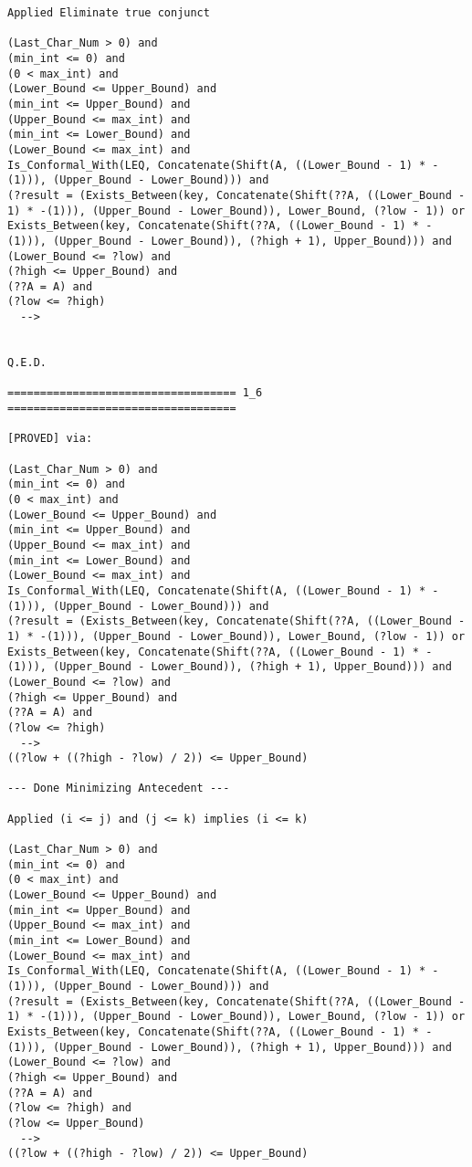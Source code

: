 \begin{lstlisting}[language=resolve]
Applied Eliminate true conjunct

(Last_Char_Num > 0) and
(min_int <= 0) and
(0 < max_int) and
(Lower_Bound <= Upper_Bound) and
(min_int <= Upper_Bound) and
(Upper_Bound <= max_int) and
(min_int <= Lower_Bound) and
(Lower_Bound <= max_int) and
Is_Conformal_With(LEQ, Concatenate(Shift(A, ((Lower_Bound - 1) * -(1))), (Upper_Bound - Lower_Bound))) and
(?result = (Exists_Between(key, Concatenate(Shift(??A, ((Lower_Bound - 1) * -(1))), (Upper_Bound - Lower_Bound)), Lower_Bound, (?low - 1)) or Exists_Between(key, Concatenate(Shift(??A, ((Lower_Bound - 1) * -(1))), (Upper_Bound - Lower_Bound)), (?high + 1), Upper_Bound))) and
(Lower_Bound <= ?low) and
(?high <= Upper_Bound) and
(??A = A) and
(?low <= ?high)
  -->


Q.E.D.

=================================== 1_6 ===================================

[PROVED] via:

(Last_Char_Num > 0) and
(min_int <= 0) and
(0 < max_int) and
(Lower_Bound <= Upper_Bound) and
(min_int <= Upper_Bound) and
(Upper_Bound <= max_int) and
(min_int <= Lower_Bound) and
(Lower_Bound <= max_int) and
Is_Conformal_With(LEQ, Concatenate(Shift(A, ((Lower_Bound - 1) * -(1))), (Upper_Bound - Lower_Bound))) and
(?result = (Exists_Between(key, Concatenate(Shift(??A, ((Lower_Bound - 1) * -(1))), (Upper_Bound - Lower_Bound)), Lower_Bound, (?low - 1)) or Exists_Between(key, Concatenate(Shift(??A, ((Lower_Bound - 1) * -(1))), (Upper_Bound - Lower_Bound)), (?high + 1), Upper_Bound))) and
(Lower_Bound <= ?low) and
(?high <= Upper_Bound) and
(??A = A) and
(?low <= ?high)
  -->
((?low + ((?high - ?low) / 2)) <= Upper_Bound)

--- Done Minimizing Antecedent ---

Applied (i <= j) and (j <= k) implies (i <= k)

(Last_Char_Num > 0) and
(min_int <= 0) and
(0 < max_int) and
(Lower_Bound <= Upper_Bound) and
(min_int <= Upper_Bound) and
(Upper_Bound <= max_int) and
(min_int <= Lower_Bound) and
(Lower_Bound <= max_int) and
Is_Conformal_With(LEQ, Concatenate(Shift(A, ((Lower_Bound - 1) * -(1))), (Upper_Bound - Lower_Bound))) and
(?result = (Exists_Between(key, Concatenate(Shift(??A, ((Lower_Bound - 1) * -(1))), (Upper_Bound - Lower_Bound)), Lower_Bound, (?low - 1)) or Exists_Between(key, Concatenate(Shift(??A, ((Lower_Bound - 1) * -(1))), (Upper_Bound - Lower_Bound)), (?high + 1), Upper_Bound))) and
(Lower_Bound <= ?low) and
(?high <= Upper_Bound) and
(??A = A) and
(?low <= ?high) and
(?low <= Upper_Bound)
  -->
((?low + ((?high - ?low) / 2)) <= Upper_Bound)


\end{lstlisting}
